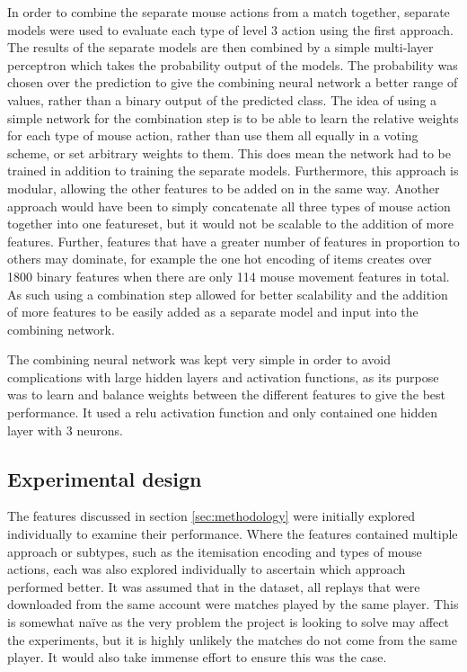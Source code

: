 \documentclass[Report.tex]{subfiles}
\begin{document}
In order to combine the separate mouse actions from a match together, separate models were used to evaluate each type of level 3 action using the first approach. The results of the separate models are then combined by a simple multi-layer perceptron which takes the probability output of the models. The probability was chosen over the prediction to give the combining neural network a better range of values, rather than a binary output of the predicted class. The idea of using a simple network for the combination step is to be able to learn the relative weights for each type of mouse action, rather than use them all equally in a voting scheme, or set arbitrary weights to them. This does mean the network had to be trained in addition to training the separate models. Furthermore, this approach is modular, allowing the other features to be added on in the same way. Another approach would have been to simply concatenate all three types of mouse action together into one featureset, but it would not be scalable to the addition of more features. Further, features that have a greater number of features in proportion to others may dominate, for example the one hot encoding of items creates over 1800 binary features when there are only 114 mouse movement features in total. As such using a combination step allowed for better scalability and the addition of more features to be easily added as a separate model and input into the combining network.

The combining neural network was kept very simple in order to avoid complications with large hidden layers and activation functions, as its purpose was to learn and balance weights between the different features to give the best performance. It used a relu activation function and only contained one hidden layer with 3 neurons.


\subsection{Experimental design}\label{sec:game-experimental}
The features discussed in section \ref{sec:methodology} were initially explored individually to examine their performance. Where the features contained multiple approach or subtypes, such as the itemisation encoding and types of mouse actions, each was also explored individually to ascertain which approach performed better. It was assumed that in the dataset, all replays that were downloaded from the same account were matches played by the same player. This is somewhat na\"{i}ve as the very problem the project is looking to solve may affect the experiments, but it is highly unlikely the matches do not come from the same player. It would also take immense effort to ensure this was the case.
\end{document}
